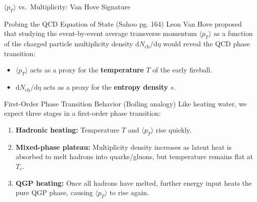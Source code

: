 \documentclass[aspectratio=169]{beamer}
\begin{document}
\begin{frame}{$\langle p_T \rangle$ vs.\ Multiplicity: Van Hove Signature}
    \begin{block}{Probing the QCD Equation of State (Sahoo pg. 164)}
        \small
        Leon Van Hove proposed that studying the event-by-event average transverse momentum $\langle p_T \rangle$ as a function of the charged particle multiplicity density $\mathrm{d}N_{\mathrm{ch}}/\mathrm{d}\eta$ would reveal the QCD phase transition:
        \begin{itemize}
            \item $\langle p_T \rangle$ acts as a proxy for the \textbf{temperature} $T$ of the early fireball.
            \item $\mathrm{d}N_{\mathrm{ch}}/\mathrm{d}\eta$ acts as a proxy for the \textbf{entropy density} $s$.
        \end{itemize}
    \end{block}
    \begin{block}{First-Order Phase Transition Behavior (Boiling analogy)}
        \footnotesize
        Like heating water, we expect three stages in a first-order phase transition:
        \begin{enumerate}
            \item \textbf{Hadronic heating:} Temperature $T$ and $\langle p_T \rangle$ rise quickly.
            \item \textbf{Mixed-phase plateau:} Multiplicity density increases as latent heat is absorbed to melt hadrons into quarks/gluons, but temperature remains flat at $T_c$.
            \item \textbf{QGP heating:} Once all hadrons have melted, further energy input heats the pure QGP phase, causing $\langle p_T \rangle$ to rise again.
        \end{enumerate}
    \end{block}
\end{frame}
\end{document}

